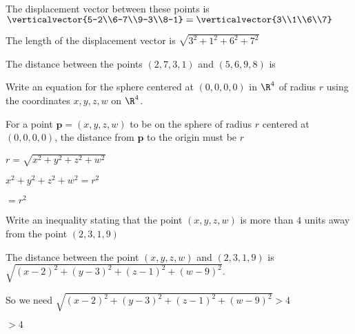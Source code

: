 \documentclass{ximera}
\begin{document}
\begin{question}
  \begin{solution}
    \begin{hint}
      The displacement vector between these points is $\verticalvector{5-2\\6-7\\9-3\\8-1} = \verticalvector{3\\1\\6\\7}$
    \end{hint}
    \begin{hint}
      The length of the displacement vector is $\sqrt{3^2+1^2+6^2+7^2}$
    \end{hint}
    The distance between the points $(2,7,3,1)$ and $(5,6,9,8)$ is 
  \end{solution}
\end{question}

\begin{question}
  Write an equation for the sphere centered at $(0,0,0,0)$ in $\R^4$ of radius $r$ using the coordinates $x,y,z,w$ on $\R^4$.
  \begin{solution}
    \begin{hint}
      For a point $\mathbf{p}=(x,y,z,w)$ to be on the sphere of radius $r$ centered at $(0,0,0,0)$, the distance from $\mathbf{p}$
      to the origin must be $r$
    \end{hint}
    \begin{hint}
      $r = \sqrt{x^2+y^2+z^2+w^2}$
    \end{hint}
    \begin{hint}
      $x^2+y^2+z^2+w^2=r^2$
    \end{hint}
     $= r^2$
  \end{solution}
\end{question}

\begin{question}
  Write an inequality stating that the point $(x,y,z,w)$ is more than $4$ units away from the point $(2,3,1,9)$
  \begin{solution}
    \begin{hint}
      The distance between the point $(x,y,z,w)$ and $(2,3,1,9)$ is $\sqrt{(x-2)^2+(y-3)^2+(z-1)^2+(w-9)^2}$.
    \end{hint}
    \begin{hint}
      So we need $\sqrt{(x-2)^2+(y-3)^2+(z-1)^2+(w-9)^2} > 4$
    \end{hint}
     $>4$ 
  \end{solution}
\end{question}
\end{document}

